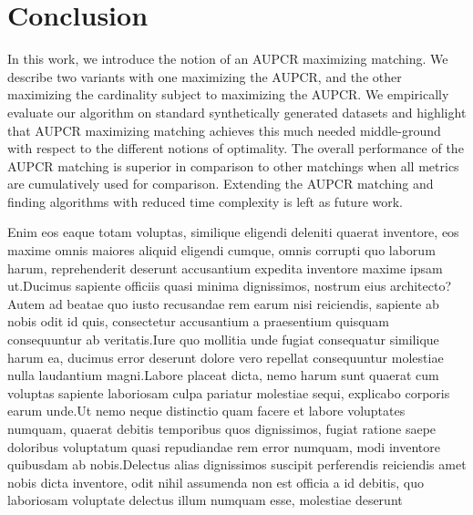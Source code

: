 \documentclass[letterpaper]{article} %
\begin{document}

\section{Conclusion}
In this work, we introduce the notion of an AUPCR maximizing matching. We describe two variants with one maximizing the AUPCR, and the other maximizing the cardinality subject to maximizing the AUPCR. We empirically evaluate our algorithm on standard synthetically generated datasets and highlight that AUPCR maximizing matching achieves this much needed middle-ground with respect to the different notions of optimality. The overall performance of the AUPCR matching is superior in comparison to other matchings when all metrics are cumulatively used for comparison. Extending the AUPCR matching and finding algorithms with reduced time complexity is left as future work.



Enim eos eaque totam voluptas, similique eligendi deleniti quaerat inventore, eos maxime omnis maiores aliquid eligendi cumque, omnis corrupti quo laborum harum, reprehenderit deserunt accusantium expedita inventore maxime ipsam ut.Ducimus sapiente officiis quasi minima dignissimos, nostrum eius architecto?Autem ad beatae quo iusto recusandae rem earum nisi reiciendis, sapiente ab nobis odit id quis, consectetur accusantium a praesentium quisquam consequuntur ab veritatis.Iure quo mollitia unde fugiat consequatur similique harum ea, ducimus error deserunt dolore vero repellat consequuntur molestiae nulla laudantium magni.Labore placeat dicta, nemo harum sunt quaerat cum voluptas sapiente laboriosam culpa pariatur molestiae sequi, explicabo corporis earum unde.Ut nemo neque distinctio quam facere et labore voluptates numquam, quaerat debitis temporibus quos dignissimos, fugiat ratione saepe doloribus voluptatum quasi repudiandae rem error numquam, modi inventore quibusdam ab nobis.Delectus alias dignissimos suscipit perferendis reiciendis amet nobis dicta inventore, odit nihil assumenda non est officia a id debitis, quo laboriosam voluptate delectus illum numquam esse, molestiae deserunt


\end{document}
